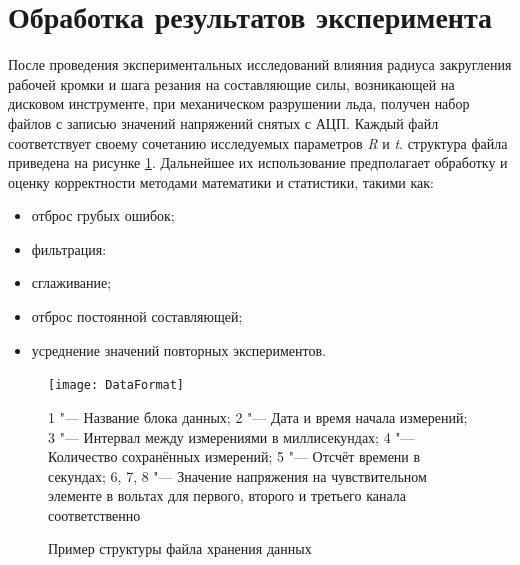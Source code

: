 
	\section{Обработка результатов эксперимента}
	
	После проведения экспериментальных исследований влияния радиуса закругления рабочей кромки и шага резания на составляющие силы, возникающей на дисковом инструменте, при механическом разрушении льда, получен набор файлов с записью значений напряжений снятых с АЦП. Каждый файл соответствует своему сочетанию исследуемых параметров \textit{R} и \textit{t}. структура файла приведена на рисунке \ref{fig:FileMap}. Дальнейшее их использование предполагает обработку и оценку корректности методами математики и статистики, такими как:
	\begin{itemize}
		\item отброс грубых ошибок;   
		\item фильтрация:
		\item сглаживание;
		\item отброс постоянной составляющей;
		\item усреднение значений повторных экспериментов.
	\end{itemize}

	\begin{figure}[ht]
		\centering
		\texttt{[image: DataFormat]}

		1 "--- Название блока данных; 2 "--- Дата и время начала измерений; 3 "--- Интервал между измерениями в миллисекундах; 4 "--- Количество сохранённых измерений; 5 "--- Отсчёт времени в секундах; 6, 7, 8 "--- Значение напряжения на чувствительном элементе в вольтах для первого, второго и третьего канала соответственно
		\caption{Пример структуры файла хранения данных}
		\label{fig:FileMap}
	\end{figure}


